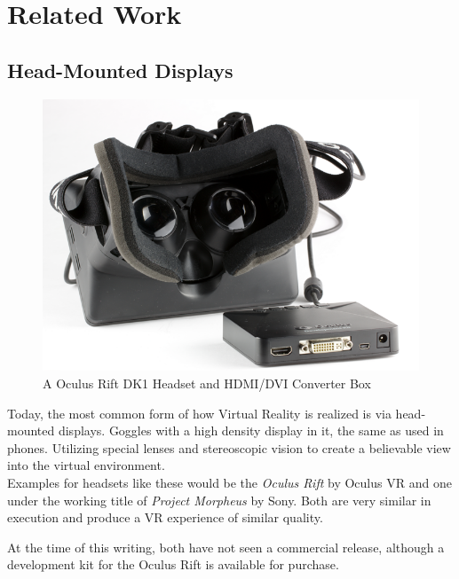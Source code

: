 \documentclass[11pt]{article}
\begin{document}
\section{Related Work}
	\subsection{Head-Mounted Displays}
	
	\begin{figure}
		\vspace{-20pt}
		\begin{center}
			\includegraphics[scale=0.3]{images/or_small.png}
		\end{center}			
		\vspace{-20pt}
			\caption{A Oculus Rift DK1 Headset and HDMI/DVI Converter Box}
		\vspace{-10pt}
	\end{figure}
	
		Today, the most common form of how Virtual Reality is realized is via head-mounted displays. Goggles with a high density display in it, the same as used in phones. Utilizing special lenses and stereoscopic vision to create a believable view into the virtual environment. \\
		Examples for headsets like these would be the \emph{Oculus Rift} by Oculus VR and one under the working title of \emph{Project Morpheus} by Sony. Both are very similar in execution and produce a VR experience of similar quality. \cite{goradia2014review}
	
	
	At the time of this writing, both have not seen a commercial release, although a development kit for the Oculus Rift is available for purchase.
\end{document}
